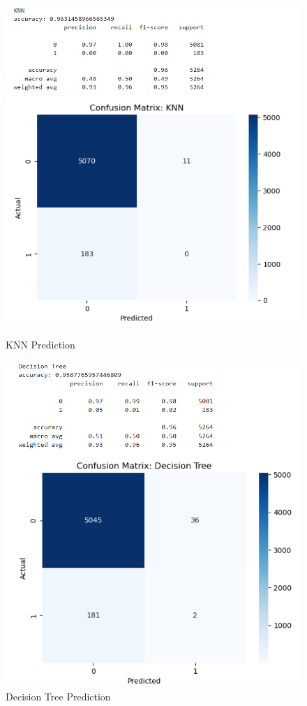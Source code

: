 \documentclass{article}
\begin{document}
\begin{figure}[h!]
	\begin{minipage}{0.48\textwidth}
		\centering
		\includegraphics[width=0.6\linewidth]{../Image/P37.jpg}
		\caption{KNN Prediction}
		\label{fig:P37}
	\end{minipage}\hfill
	\begin{minipage}{0.48\textwidth}
		\centering
		\includegraphics[width=0.6\linewidth]{../Image/P38.jpg}
		\caption{Decision Tree Prediction}
		\label{fig:P38}
	\end{minipage}
	
	\vspace{0.5cm} %
	

\end{figure}
\end{document}
